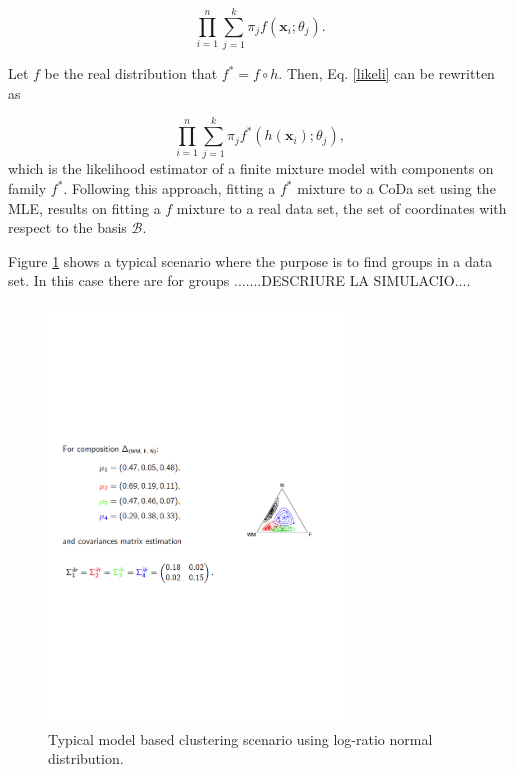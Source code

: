 \documentclass[10pt, a4paper]{article}
\begin{document}
\begin{equation}\label{likeli}
\prod_{i=1}^n \sum_{j=1}^k \pi_j f(\textbf{x}_i; \theta_j).
\end{equation}

Let $f$ be the real distribution that $f^* = f \circ h$. Then, Eq. \ref{likeli} can be rewritten as

\begin{equation}\label{likeliR}
\prod_{i=1}^n \sum_{j=1}^k \pi_j f^*(h(\textbf{x}_i); \theta_j),
\end{equation}
which is the likelihood estimator of a finite mixture model with components on family $f^*$.
Following this approach, fitting a $f^*$ mixture to a CoDa set using the MLE, results on fitting a $f$ mixture to a real data set, the set of coordinates with respect to the basis $\mathcal{B}$. 

Figure \ref{fig03logratiodens} shows a typical scenario where the purpose is to find groups in a data set. In this case there are for groups .......DESCRIURE LA SIMULACIO....

\begin{figure}[htbp]
\centering
\includegraphics[trim=0cm 6cm 0cm 6cm,width=0.7\textwidth]{fig03_logratiodens.pdf}
\caption{Typical model based clustering scenario using log-ratio normal distribution.}
\label{fig03logratiodens}
\end{figure}
\end{document}
